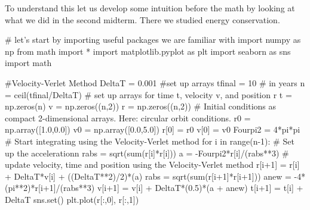 \documentclass[%
oneside,                 %
final,                   %
10pt]{article}
\begin{document}
To understand this let us develop some intuition before the math by looking at what we did in the second midterm. There we studied energy conservation.








































































\bpycod
# let's start by importing useful packages we are familiar with
import numpy as np
from math import *
import matplotlib.pyplot as plt
import seaborn as sns
import math 

#Velocity-Verlet Method
DeltaT = 0.001
#set up arrays 
tfinal = 10 # in years
n = ceil(tfinal/DeltaT)
# set up arrays for time t, velocity v, and position r
t = np.zeros(n)
v = np.zeros((n,2))
r = np.zeros((n,2))
# Initial conditions as compact 2-dimensional arrays. Here: circular orbit conditions.
r0 = np.array([1.0,0.0])
v0 = np.array([0.0,5.0])
r[0] = r0
v[0] = v0
Fourpi2 = 4*pi*pi
# Start integrating using the Velocity-Verlet method
for i in range(n-1):
    # Set up the accelerationn
    rabs = sqrt(sum(r[i]*r[i]))
    a = -Fourpi2*r[i]/(rabs**3)
    # update velocity, time and position using the Velocity-Verlet  method
    r[i+1] = r[i] + DeltaT*v[i] + ((DeltaT**2)/2)*(a)
    rabs = sqrt(sum(r[i+1]*r[i+1]))
    anew = -4*(pi**2)*r[i+1]/(rabs**3)
    v[i+1] = v[i] + DeltaT*(0.5)*(a + anew)
    t[i+1] = t[i] + DeltaT
sns.set()
plt.plot(r[:,0], r[:,1])
\end{document}
